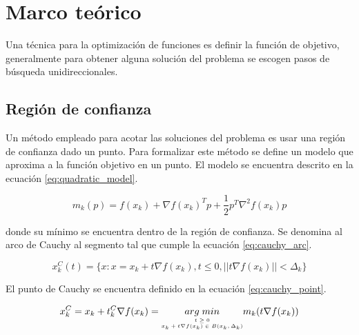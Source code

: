 \section{Marco teórico}

Una técnica para la optimización de funciones es definir la función de objetivo, generalmente para obtener alguna solución del problema se escogen pasos de búsqueda unidireccionales.

\subsection{Región de confianza}

Un método empleado para acotar las soluciones del problema es usar una región de confianza dado un punto. Para formalizar este método se define un modelo que aproxima a la función objetivo en un punto. El modelo se encuentra descrito en la ecuación \ref{eq:quadratic_model}.

\begin{equation}
    m_k (p) = f(x_k) + \nabla f(x_k)^T p + \frac{1}{2} p^T \nabla^2 f(x_k) p
    \label{eq:quadratic_model}
\end{equation}

donde su mínimo se encuentra dentro de la región de confianza. Se denomina al arco de Cauchy al segmento tal que cumple la ecuación \ref{eq:cauchy_arc}.

\begin{equation}
    x_k^C(t) = \{x: x=x_k + t\nabla f(x_k), t\leq 0, ||t\nabla f(x_k)|| < \Delta_k \}
    \label{eq:cauchy_arc}
\end{equation}

El punto de Cauchy se encuentra definido en la ecuación \ref{eq:cauchy_point}.

\begin{equation}
    x_k^C = x_k + t_k^C \nabla f(x_k) = \underset{\tiny \begin{matrix}t\geq 0 \\ x_k + t \nabla f(x_k) \in B(x_k,\Delta_k) \end{matrix}}{arg\; min} m_k(t\nabla f(x_k)) \label{eq:cauchy_point}
\end{equation}


